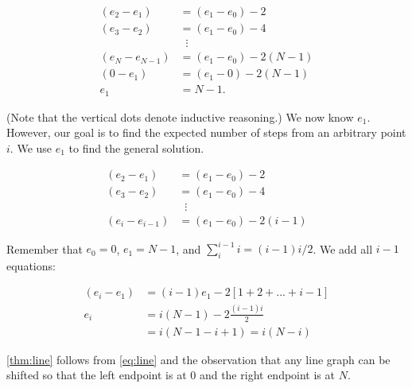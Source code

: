 \documentclass[12pt]{article}
\theoremstyle{definition}
\begin{document}
\begin{align}
(e_2 - e_1) &= (e_1-e_0) -2 \nonumber\\
(e_3 - e_2) &= (e_1-e_0) -4 \nonumber\\
&\;\;\vdots \nonumber\\
\left(e_N - e_{N-1}\right) &= \left(e_1 - e_0\right) - 2 (N-1) \nonumber \\
\left(0 - e_1\right) &= \left(e_1 - 0\right) - 2 (N-1) \nonumber \\
e_1 &= N-1. \nonumber
\end{align}

(Note that the vertical dots denote inductive reasoning.)
We now know $e_1$.
However, our goal is to find the expected number of steps
from an arbitrary point $i$.
We use $e_1$ to find the general solution.

\begin{comment}
\begin{align}
e_2  &= e_1 + (e_1 - e_0) - 2 = 2 (N - 2) \nonumber\\
e_3  &= e_2 + (e_2 - e_1) - 2 = 2 \left[2 (N-2) \right] - (N-1) -2 = 3 (N - 3) \nonumber\\
&\;\;\vdots \nonumber\\
e_i &= i (N-i) \label{eq:line}
\end{align}
\end{comment}

\begin{align}
(e_2 - e_1) &= (e_1-e_0) -2 \nonumber\\
(e_3 - e_2) &= (e_1-e_0) -4 \nonumber\\
&\;\;\vdots \nonumber\\
(e_i-e_{i-1}) &= (e_1 - e_0) - 2(i-1) \nonumber
\end{align}

Remember that $e_0=0$, $e_1=N-1$, and 
$\sum_{i}^{i-1} i = (i-1)i/2$.
We add all $i-1$ equations:

\begin{align}
(e_i - e_1) &= (i-1) e_1 - 2[1+2+...+i-1] \nonumber \\
e_i &= i(N-1) - 2 \frac{(i-1)i}{2} \nonumber\\
&= i(N-1 - i + 1) = i(N-i)
\label{eq:line}
\end{align}



\cref{thm:line} follows from \cref{eq:line} and the observation that any
line graph can be shifted so that the left endpoint
is at $0$ and the right endpoint is at $N$.
\end{document}
